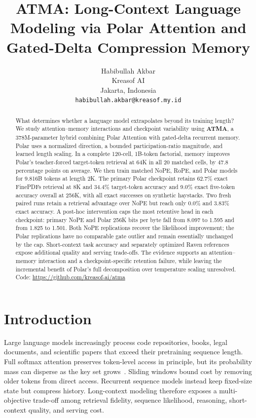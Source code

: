 \documentclass{article}
\title{ATMA: Long-Context Language Modeling via Polar Attention and Gated-Delta Compression Memory}
\author{Habibullah Akbar \\
Kreasof AI \\
Jakarta, Indonesia \\
\texttt{habibullah.akbar@kreasof.my.id}}
\begin{document}
\maketitle

\begin{abstract}
What determines whether a language model extrapolates beyond its training length? We study attention--memory interactions and checkpoint variability using \textbf{ATMA}, a 378M-parameter hybrid combining Polar Attention with gated-delta recurrent memory. Polar uses a normalized direction, a bounded participation-ratio magnitude, and learned length scaling. In a complete 120-cell, 1B-token factorial, memory improves Polar's teacher-forced target-token retrieval at 64K in all 20 matched cells, by 47.8 percentage points on average. We then train matched NoPE, RoPE, and Polar models for 9.816B tokens at length 2K. The primary Polar checkpoint retains 62.7\% exact FinePDFs retrieval at 8K and 34.4\% target-token accuracy and 9.0\% exact five-token accuracy overall at 256K, with all exact successes on synthetic haystacks. Two fresh paired runs retain a retrieval advantage over NoPE but reach only 0.0\% and 3.83\% exact accuracy. A post-hoc intervention caps the most retentive head in each checkpoint: primary NoPE and Polar 256K bits per byte fall from 8.097 to 1.595 and from 1.825 to 1.501. Both NoPE replications recover the likelihood improvement; the Polar replications have no comparable gate outlier and remain essentially unchanged by the cap. Short-context task accuracy and separately optimized Raven references expose additional quality and serving trade-offs. The evidence supports an attention--memory interaction and a checkpoint-specific retention failure, while leaving the incremental benefit of Polar's full decomposition over temperature scaling unresolved.
Code: \url{https://github.com/kreasof-ai/atma}
\end{abstract}

\section{Introduction}

Large language models increasingly process code repositories, books, legal documents, and scientific papers that exceed their pretraining sequence length. Full softmax attention preserves token-level access in principle, but its probability mass can disperse as the key set grows~\citep{nakanishi2025scalable,velickovic2025softmax,barbero2024glasses}. Sliding windows bound cost by removing older tokens from direct access. Recurrent sequence models instead keep fixed-size state but compress history. Long-context modeling therefore exposes a multi-objective trade-off among retrieval fidelity, sequence likelihood, reasoning, short-context quality, and serving cost.
\end{document}

